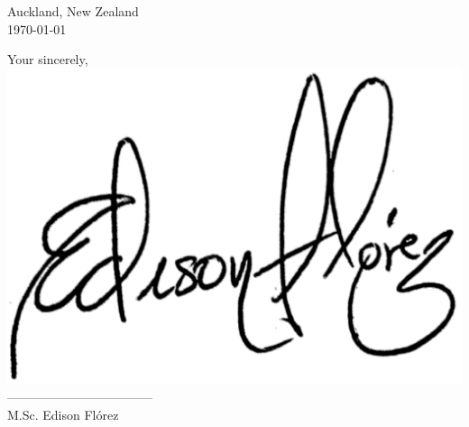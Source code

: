 \documentclass[12pt]{extarticle}
\begin{document}
\vspace*{5mm}
 Auckland, New Zealand\\
 \today

\vfill

\begin{flushright}
 Your sincerely,\\ \vspace*{4mm} 
  \includegraphics[scale=0.23]{img/firma.pdf}\\ \vspace*{-10mm}  
 -----------------------------------\\
 M.Sc. Edison Flórez %
 
\end{flushright}
\end{document}
